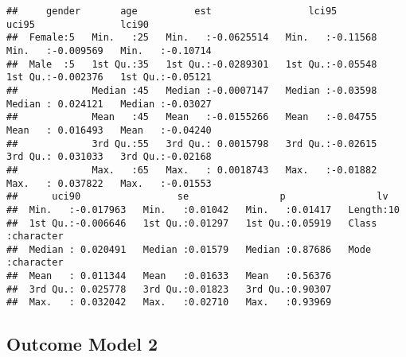 \documentclass[
]{article}
\begin{document}
\begin{verbatim}
##     gender       age          est                 lci95              uci95               lci90         
##  Female:5   Min.   :25   Min.   :-0.0625514   Min.   :-0.11568   Min.   :-0.009569   Min.   :-0.10714  
##  Male  :5   1st Qu.:35   1st Qu.:-0.0289301   1st Qu.:-0.05548   1st Qu.:-0.002376   1st Qu.:-0.05121  
##             Median :45   Median :-0.0007147   Median :-0.03598   Median : 0.024121   Median :-0.03027  
##             Mean   :45   Mean   :-0.0155266   Mean   :-0.04755   Mean   : 0.016493   Mean   :-0.04240  
##             3rd Qu.:55   3rd Qu.: 0.0015798   3rd Qu.:-0.02615   3rd Qu.: 0.031033   3rd Qu.:-0.02168  
##             Max.   :65   Max.   : 0.0018743   Max.   :-0.01882   Max.   : 0.037822   Max.   :-0.01553  
##      uci90                 se                p                lv           
##  Min.   :-0.017963   Min.   :0.01042   Min.   :0.01417   Length:10         
##  1st Qu.:-0.006646   1st Qu.:0.01297   1st Qu.:0.05919   Class :character  
##  Median : 0.020491   Median :0.01579   Median :0.87686   Mode  :character  
##  Mean   : 0.011344   Mean   :0.01633   Mean   :0.56376                     
##  3rd Qu.: 0.025778   3rd Qu.:0.01823   3rd Qu.:0.90307                     
##  Max.   : 0.032042   Max.   :0.02710   Max.   :0.93969
\end{verbatim}

\hypertarget{outcome-model-2}{%
\subsection{Outcome Model 2}\label{outcome-model-2}}
\end{document}
